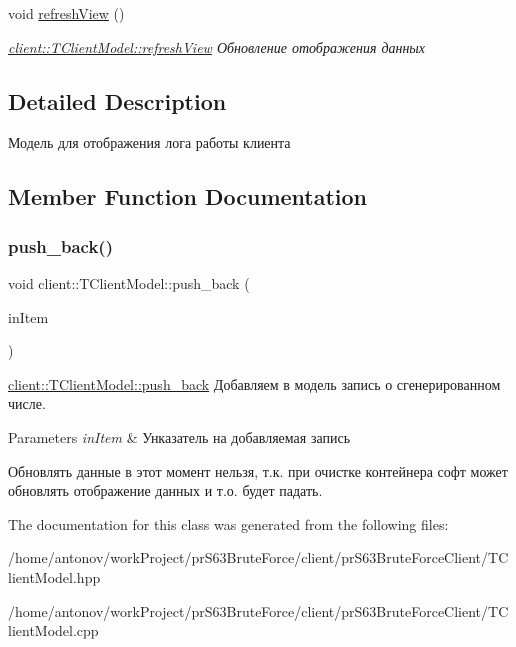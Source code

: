 \begin{DoxyCompactItemize}
\mbox{\label{classclient_1_1_t_client_model_aea0cb37f9e91c028f699e4da3663fcea}} 
void \hyperlink{classclient_1_1_t_client_model_aea0cb37f9e91c028f699e4da3663fcea}{refresh\+View} ()
\begin{DoxyCompactList}\small\item\em \hyperlink{classclient_1_1_t_client_model_aea0cb37f9e91c028f699e4da3663fcea}{client\+::\+T\+Client\+Model\+::refresh\+View} Обновление отображения данных \end{DoxyCompactList}\end{DoxyCompactItemize}


\subsection{Detailed Description}
Модель для отображения лога работы клиента 

\subsection{Member Function Documentation}
\mbox{\label{classclient_1_1_t_client_model_aed00383c6177d60cb6f4b34b23fce485}} 
\subsubsection{\texorpdfstring{push\+\_\+back()}{push\_back()}}
{\footnotesize\ttfamily void client\+::\+T\+Client\+Model\+::push\+\_\+back (\begin{DoxyParamCaption}\item[{common\+Define\+Client\+::td\+Log\+Item\+Client}]{in\+Item }\end{DoxyParamCaption})}



\hyperlink{classclient_1_1_t_client_model_aed00383c6177d60cb6f4b34b23fce485}{client\+::\+T\+Client\+Model\+::push\+\_\+back} Добавляем в модель запись о сгенерированном числе. 


\begin{DoxyParams}{Parameters}
{\em in\+Item} & Унказатель на добавляемая запись\\
\hline
\end{DoxyParams}
Обновлять данные в этот момент нельзя, т.\+к. при очистке контейнера софт может обновлять отображение данных и т.\+о. будет падать. 

The documentation for this class was generated from the following files\+:\begin{DoxyCompactItemize}
\item 
/home/antonov/work\+Project/pr\+S63\+Brute\+Force/client/pr\+S63\+Brute\+Force\+Client/T\+Client\+Model.\+hpp\item 
/home/antonov/work\+Project/pr\+S63\+Brute\+Force/client/pr\+S63\+Brute\+Force\+Client/T\+Client\+Model.\+cpp\end{DoxyCompactItemize}

